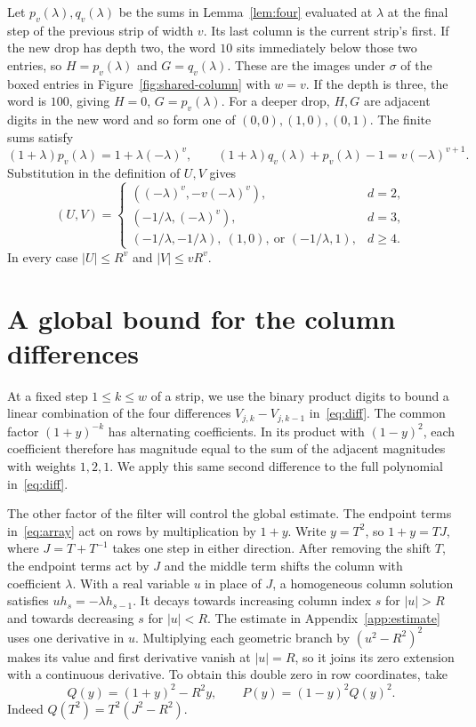 \documentclass[11pt,reqno]{amsart}
\numberwithin{equation}{section}
\begin{document}
Let $p_v(\lambda),q_v(\lambda)$ be the sums in Lemma~\ref{lem:four} evaluated at $\lambda$ at the final step of the previous strip of width $v$. Its last column is the current strip's first. If the new drop has depth two, the word $10$ sits immediately below those two entries, so $H=p_v(\lambda)$ and $G=q_v(\lambda)$. These are the images under $\sigma$ of the boxed entries in Figure~\ref{fig:shared-column} with $w=v$. If the depth is three, the word is $100$, giving $H=0$, $G=p_v(\lambda)$. For a deeper drop, $H,G$ are adjacent digits in the new word and so form one of $(0,0),(1,0),(0,1)$. The finite sums satisfy
\[
 (1+\lambda)p_v(\lambda)=1+\lambda(-\lambda)^v,\qquad
 (1+\lambda)q_v(\lambda)+p_v(\lambda)-1=v(-\lambda)^{v+1}.
\]
Substitution in the definition of $U,V$ gives
\begin{equation}\label{eq:start}
 (U,V)=
 \begin{cases}
 ((-\lambda)^v,-v(-\lambda)^v),&d=2,\\
 (-1/\lambda,(-\lambda)^v),&d=3,\\
 (-1/\lambda,-1/\lambda),\ (1,0),\ \text{or }(-1/\lambda,1),&d\ge4.
 \end{cases}
\end{equation}
In every case $|U|\le R^v$ and $|V|\le vR^v$.

\section{A global bound for the column differences}\label{sec:filter}
At a fixed step $1\le k\le w$ of a strip, we use the binary product digits to bound a linear combination of the four differences $V_{j,k}-V_{j,k-1}$ in~\eqref{eq:diff}. The common factor $(1+y)^{-k}$ has alternating coefficients. In its product with $(1-y)^2$, each coefficient therefore has magnitude equal to the sum of the adjacent magnitudes with weights $1,2,1$. We apply this same second difference to the full polynomial in~\eqref{eq:diff}.

The other factor of the filter will control the global estimate. The endpoint terms in~\eqref{eq:array} act on rows by multiplication by $1+y$. Write $y=T^2$, so $1+y=TJ$, where $J=T+T^{-1}$ takes one step in either direction. After removing the shift $T$, the endpoint terms act by $J$ and the middle term shifts the column with coefficient $\lambda$. With a real variable $u$ in place of $J$, a homogeneous column solution satisfies $u h_s=-\lambda h_{s-1}$. It decays towards increasing column index $s$ for $|u|>R$ and towards decreasing $s$ for $|u|<R$. The estimate in Appendix~\ref{app:estimate} uses one derivative in $u$. Multiplying each geometric branch by $(u^2-R^2)^2$ makes its value and first derivative vanish at $|u|=R$, so it joins its zero extension with a continuous derivative. To obtain this double zero in row coordinates, take
\[
 Q(y)=(1+y)^2-R^2y,\qquad P(y)=(1-y)^2Q(y)^2.
\]
Indeed $Q(T^2)=T^2(J^2-R^2)$.
\end{document}
